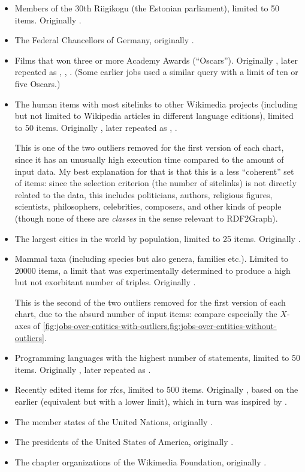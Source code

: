 \begin{itemize}
\item Members of the 30th Riigikogu (the Estonian parliament),
  limited to 50 \glspl{item}.
  Originally .
\item The Federal Chancellors of Germany,
  originally .
\item Films that won three or more Academy Awards (“Oscars”). %
  Originally , later repeated as , , .
  (Some earlier jobs used a similar query with a limit of ten or five Oscars.)
\item The human \glspl{item} with most \glspl{sitelink} to other \gls{Wikimedia} projects
  (including but not limited to \gls{Wikipedia} articles in different language editions),
  limited to 50 \glspl{item}.
  Originally , later repeated as , .

  This is one of the two outliers removed for the first version of each chart,
  since it has an unusually high execution time compared to the amount of input data.
  My best explanation for that is that this is a less “coherent” set of \glspl{item}:
  since the selection criterion (the number of sitelinks) is not directly related to the data,
  this includes politicians, authors, religious figures, scientists, philosophers, celebrities, composers, and other kinds of people
  (though none of these are \emph{classes} in the sense relevant to \gls{RDF2Graph}).
\item The largest cities in the world by population,
  limited to 25 \glspl{item}.
  Originally .
\item Mammal taxa (including species but also genera, families etc.).
  Limited to \num{20000} \glspl{item},
  a limit that was experimentally determined to produce a high but not exorbitant number of triples.
  Originally .

  This is the second of the two outliers removed for the first version of each chart,
  due to the absurd number of input \glspl{item}:
  compare especially the $X$-axes of
  \cref{fig:jobs-over-entities-with-outliers,fig:jobs-over-entities-without-outliers}.
\item Programming languages with the highest number of \glspl{statement},
  limited to 50 \glspl{item}.
  Originally , later repeated as .
\item Recently edited \glspl{item} for \glspl{rfc},
  limited to 500 \glspl{item}.
  Originally , based on the earlier  (equivalent but with a lower limit),
  which in turn was inspired by .
\item The member states of the United Nations, %
  originally .
\item The presidents of the United States of America,
  originally .
\item The chapter organizations of the \gls{Wikimedia} Foundation, %
  originally .
\end{itemize}

